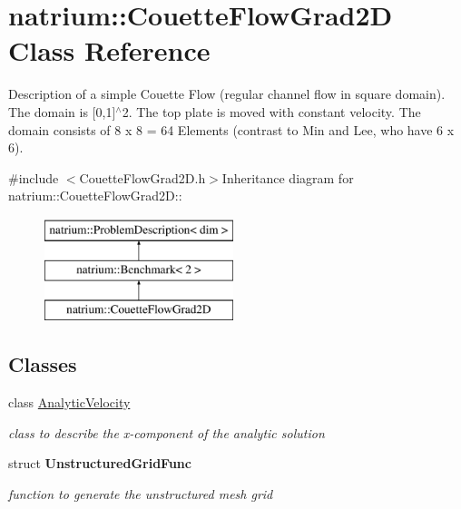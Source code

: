 \hypertarget{classnatrium_1_1CouetteFlowGrad2D}{
\section{natrium::CouetteFlowGrad2D Class Reference}
\label{classnatrium_1_1CouetteFlowGrad2D}
}


Description of a simple Couette Flow (regular channel flow in square domain). The domain is \mbox{[}0,1\mbox{]}$^\wedge$2. The top plate is moved with constant velocity. The domain consists of 8 x 8 = 64 Elements (contrast to Min and Lee, who have 6 x 6).  


{\ttfamily \#include $<$CouetteFlowGrad2D.h$>$}Inheritance diagram for natrium::CouetteFlowGrad2D::\begin{figure}[H]
\begin{center}
\leavevmode
\includegraphics[height=3cm]{classnatrium_1_1CouetteFlowGrad2D}
\end{center}
\end{figure}
\subsection*{Classes}
\begin{DoxyCompactItemize}
\item 
class \hyperlink{classnatrium_1_1CouetteFlowGrad2D_1_1AnalyticVelocity}{AnalyticVelocity}
\begin{DoxyCompactList}\small\item\em class to describe the x-\/component of the analytic solution \item\end{DoxyCompactList}\item 
struct {\bfseries UnstructuredGridFunc}
\begin{DoxyCompactList}\small\item\em function to generate the unstructured mesh grid \item\end{DoxyCompactList}\end{DoxyCompactItemize}
